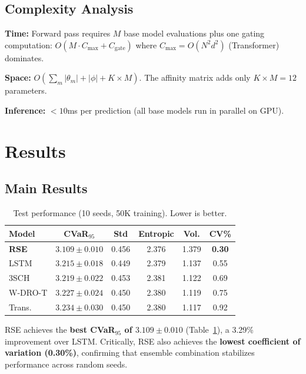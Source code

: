 \documentclass[11pt]{article}
\begin{document}
\subsection{Complexity Analysis}

\textbf{Time:} Forward pass requires $M$ base model evaluations plus one gating computation: $O(M \cdot C_{\max} + C_{\text{gate}})$ where $C_{\max} = O(N^2 d^2)$ (Transformer) dominates.

\textbf{Space:} $O(\sum_m |\theta_m| + |\phi| + K \times M)$. The affinity matrix adds only $K \times M = 12$ parameters.

\textbf{Inference:} $< 10$ms per prediction (all base models run in parallel on GPU).

\section{Results}
\label{sec:results}

\subsection{Main Results}

\begin{table}[t]
\centering
\caption{Test performance (10 seeds, 50K training). Lower is better.}
\label{tab:main}
\small
\begin{tabular}{lccccc}
\toprule
\textbf{Model} & \textbf{CVaR$_{95}$} & \textbf{Std} & \textbf{Entropic} & \textbf{Vol.} & \textbf{CV\%} \\
\midrule
\textbf{RSE} & $\mathbf{3.109 \pm 0.010}$ & 0.456 & 2.376 & 1.379 & \textbf{0.30} \\
LSTM & $3.215 \pm 0.018$ & 0.449 & 2.379 & 1.137 & 0.55 \\
3SCH & $3.219 \pm 0.022$ & 0.453 & 2.381 & 1.122 & 0.69 \\
W-DRO-T & $3.227 \pm 0.024$ & 0.450 & 2.380 & 1.119 & 0.75 \\
Trans. & $3.234 \pm 0.030$ & 0.450 & 2.380 & 1.117 & 0.92 \\
\bottomrule
\end{tabular}
\end{table}

RSE achieves the \textbf{best CVaR$_{95}$ of $3.109 \pm 0.010$} (Table~\ref{tab:main}), a 3.29\% improvement over LSTM. Critically, RSE also achieves the \textbf{lowest coefficient of variation (0.30\%)}, confirming that ensemble combination stabilizes performance across random seeds.
\end{document}
